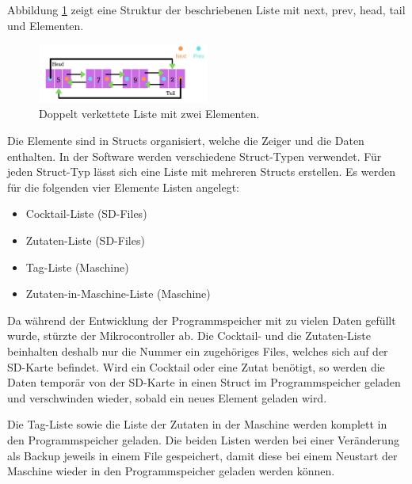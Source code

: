 Abbildung \ref{fig:Doubly_Linked_List_2_00} zeigt eine Struktur der beschriebenen Liste mit next, prev, head, tail und Elementen.

\begin{figure}[h!]
	\centering
	\includegraphics[width=0.5\textwidth]{graphics/Doubly_Linked_List_2_00}
	\caption{Doppelt verkettete Liste mit zwei Elementen.\cite{yadav_circular_2019}}
	\label{fig:Doubly_Linked_List_2_00}
\end{figure}


Die Elemente sind in Structs organisiert, welche die Zeiger und die Daten enthalten. In der Software werden verschiedene Struct-Typen verwendet. Für jeden Struct-Typ lässt sich eine Liste mit mehreren Structs erstellen. Es werden für die folgenden vier Elemente Listen angelegt:

\begin{itemize}
\item Cocktail-Liste (SD-Files)
\item Zutaten-Liste (SD-Files)
\item Tag-Liste (Maschine)
\item Zutaten-in-Maschine-Liste (Maschine)
\end{itemize}

Da während der Entwicklung der Programmspeicher mit zu vielen Daten gefüllt wurde, stürzte der Mikrocontroller ab. Die Cocktail- und die Zutaten-Liste beinhalten deshalb nur die Nummer ein zugehöriges Files, welches sich auf der SD-Karte befindet. Wird ein Cocktail oder eine Zutat benötigt, so werden die Daten temporär von der SD-Karte in einen Struct im Programmspeicher geladen und verschwinden wieder, sobald ein neues Element geladen wird.

Die Tag-Liste sowie die Liste der Zutaten in der Maschine werden komplett in den Programmspeicher geladen. Die beiden Listen werden bei einer Veränderung als Backup jeweils in einem File gespeichert, damit diese bei einem Neustart der Maschine wieder in den Programmspeicher geladen werden können.